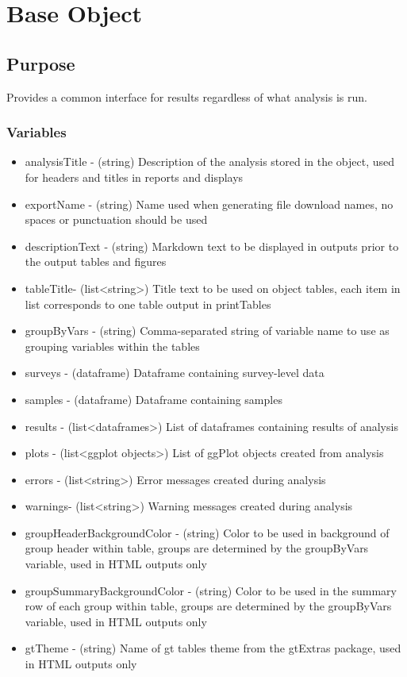 \documentclass[
  letterpaper,
  DIV=11,
  numbers=noendperiod]{scrreprt}
\begin{document}
\chapter{Base Object}\label{base-object}

\section{Purpose}\label{purpose}

Provides a common interface for results regardless of what analysis is
run.

\subsection{Variables}\label{variables}

\begin{itemize}
\item
  analysisTitle - (string) Description of the analysis stored in the
  object, used for headers and titles in reports and displays
\item
  exportName - (string) Name used when generating file download names,
  no spaces or punctuation should be used
\item
  descriptionText - (string) Markdown text to be displayed in outputs
  prior to the output tables and figures
\item
  tableTitle- (list\textless string\textgreater) Title text to be used
  on object tables, each item in list corresponds to one table output in
  printTables
\item
  groupByVars - (string) Comma-separated string of variable name to use
  as grouping variables within the tables
\item
  surveys - (dataframe) Dataframe containing survey-level data
\item
  samples - (dataframe) Dataframe containing samples
\item
  results - (list\textless dataframes\textgreater) List of dataframes
  containing results of analysis
\item
  plots - (list\textless ggplot objects\textgreater) List of ggPlot
  objects created from analysis
\item
  errors - (list\textless string\textgreater) Error messages created
  during analysis
\item
  warnings- (list\textless string\textgreater) Warning messages created
  during analysis
\item
  groupHeaderBackgroundColor - (string) Color to be used in background
  of group header within table, groups are determined by the groupByVars
  variable, used in HTML outputs only
\item
  groupSummaryBackgroundColor - (string) Color to be used in the summary
  row of each group within table, groups are determined by the
  groupByVars variable, used in HTML outputs only
\item
  gtTheme - (string) Name of gt tables theme from the gtExtras package,
  used in HTML outputs only
\end{itemize}
\end{document}
